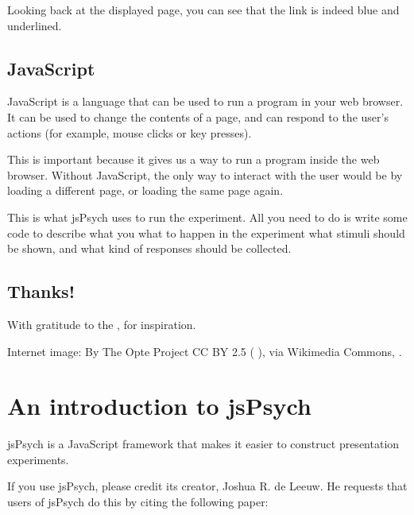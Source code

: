 \documentclass[letterpaper,10pt,english]{sphinxmanual}
\begin{document}
Looking back at the displayed page, you can see that the link is indeed blue
and underlined.


\section{JavaScript}
\label{\detokenize{web:javascript}}
JavaScript is a language that can be used to run a program in your web browser.
It can be used to change the contents of a page, and can respond to the user’s
actions (for example, mouse clicks or key presses).

This is important because it gives us a way to run a program inside the web
browser. Without JavaScript, the only way to interact with the user would be
by loading a different page, or loading the same page again.

This is what jsPsych uses to run the experiment. All you need to do is write
some code to describe what you what to happen in the experiment \textendash{} what
stimuli should be shown, and what kind of responses should be collected.


\section{Thanks!}
\label{\detokenize{web:thanks}}
With gratitude to the
,
for inspiration.

Internet image: By The Opte Project CC BY 2.5 ( ),
via Wikimedia Commons,  .


\chapter{An introduction to jsPsych}
\label{\detokenize{jspsych_au:an-introduction-to-jspsych}}\label{\detokenize{jspsych_au::doc}}
jsPsych is a JavaScript framework that makes it easier to construct
presentation experiments.

 If you use jsPsych, please credit its creator, Joshua R. de Leeuw.
He requests that users of jsPsych do this by citing the following paper:

\end{document}
